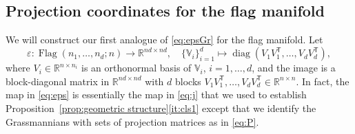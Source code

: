 \documentclass[11pt,reqno]{amsart}%
\theoremstyle{definition}
\theoremstyle{remark}
\newcommand{\tp}{{\scriptscriptstyle\mathsf{T}}}
\DeclareMathOperator{\Flag}{Flag}
\DeclareMathOperator{\diag}{diag}
\begin{document}
\subsection{Projection coordinates for the flag manifold}\label{sec:proj}

We will construct our first analogue of  \eqref{eq:epsGr} for the  flag manifold. Let
\begin{equation}\label{eq:eps}
\varepsilon : \Flag(n_1,\dots,n_d;n) \to \mathbb{R}^{nd\times nd}, \quad
\{\mathbb{V}_i\}_{i=1}^d \mapsto \diag (V_1V_1^\tp , \dots, V_d V_d^\tp  ),
\end{equation}
where $V_i \in \mathbb{R}^{n\times n_i}$ is an orthonormal basis of $\mathbb{V}_i$, $i=1,\dots, d$, and the image is a block-diagonal matrix in $\mathbb{R}^{nd \times nd}$ with $d$ blocks  $V_1V_1^\tp , \dots, V_d V_d^\tp \in \mathbb{R}^{n \times n}$. In fact, the map in \eqref{eq:eps} is essentially the map in \eqref{eq:j} that we used to establish Proposition~\ref{prop:geometric structure}\eqref{it:cls1} except that we identify the Grassmannians with sets of projection matrices as in \eqref{eq:P}.
\end{document}
